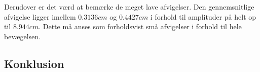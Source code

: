 Derudover er det værd at bemærke de meget lave afvigelser. 
Den gennemsnitlige afvigelse ligger imellem $0.3136cm$ og $0.4427cm$ i forhold til amplituder på helt op til $8.944cm$. 
Dette må anses som forholdsvist små afvigelser i forhold til hele bevægelsen.

\subsection{Konklusion}



